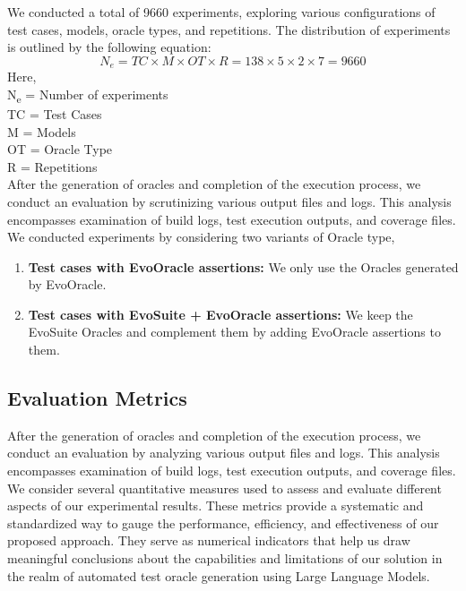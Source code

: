We conducted a total of 9660 experiments, exploring various configurations of test cases, models, oracle types, and repetitions. The distribution of experiments is outlined by the following equation:
\[
N_e = TC \times M \times OT \times R = 138 \times 5 \times 2 \times 7 = 9660
\]
Here, \\
N\textsubscript{e} = Number of experiments\\
TC = Test Cases\\
M = Models\\
OT = Oracle Type\\
R = Repetitions\\
After the generation of oracles and completion of the execution process, we conduct an evaluation by scrutinizing various output files and logs. This analysis encompasses examination of build logs, test execution outputs, and coverage files.
\noindent
We conducted experiments by considering two variants of Oracle type, 
\begin{enumerate}
    \item \textbf{Test cases with EvoOracle assertions:} We only use the Oracles generated by EvoOracle.
    \item \textbf{Test cases with EvoSuite + EvoOracle assertions:} We keep the EvoSuite Oracles and complement them by adding EvoOracle assertions to them.
\end{enumerate}
\vspace{0.1 cm}
\subsection{Evaluation Metrics}
\label{sec:evaluation_metrics}
\vspace{0.1 cm}
After the generation of oracles and completion of the execution process, we conduct an evaluation by analyzing various output files and logs. This analysis encompasses examination of build logs, test execution outputs, and coverage files. We consider several quantitative measures used to assess and evaluate different aspects of our experimental results. These metrics provide a systematic and standardized way to gauge the performance, efficiency, and effectiveness of our proposed approach. They serve as numerical indicators that help us draw meaningful conclusions about the capabilities and limitations of our solution in the realm of automated test oracle generation using Large Language Models.

